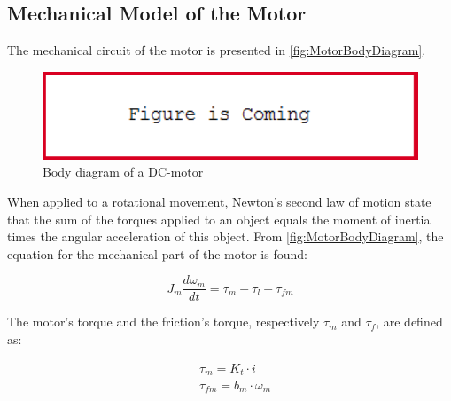 \subsection*{Mechanical Model of the Motor}
The mechanical circuit of the motor is presented in \autoref{fig:MotorBodyDiagram}.

\begin{figure}[htbp]
	\centering
 	\includegraphics[width=1\textwidth]{figures/FigureIsComing.PNG} 
 	\caption{Body diagram of a DC-motor}
 	\label{fig:MotorBodyDiagram}
\end{figure}

When applied to a rotational movement, Newton's second law of motion state that the sum of the torques applied to an object equals the moment of inertia times the angular acceleration of this object. From \autoref{fig:MotorBodyDiagram}, the equation for the mechanical part of the motor is found:

\begin{equation}
	J_{m} \frac{d\omega_{m}}{dt} = \tau_{m} - \tau_{l} - \tau_{fm}
	\label{eq:MotorMechanical}
\end{equation}

\startexplain
\stopexplain

The motor's torque and the friction's torque, respectively $\tau_m$ and $\tau_f$, are defined as:

\begin{subequations}\label{eq:tauLm}
	\begin{flalign}
		&\tau_m = K_t \cdot i \label{eq:MotorTorque}\\	
		&\tau_{fm} = b_{m}\cdot\omega_{m}	\label{eq:FrictionTorque}
	\end{flalign}
\end{subequations}

\startexplain
\stopexplain

